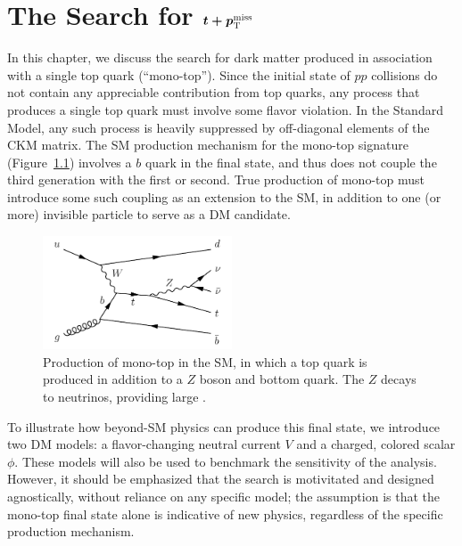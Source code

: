 \chapter{The Search for $\boldmath{t+p_\text{T}^\text{miss}}$}
\label{sec:mt}

In this chapter, we discuss the search for dark matter produced in association with a single top quark (``mono-top'').
Since the initial state of $pp$ collisions do not contain any appreciable contribution from top quarks, any process that produces a single top quark must involve some flavor violation.
In the Standard Model, any such process is heavily suppressed by off-diagonal elements of the CKM matrix.
The SM production mechanism for the mono-top signature (Figure~\ref{fig:mt:tzq}) involves a $b$ quark in the final state, and thus does not couple the third generation with the first or second.
True production of mono-top must introduce some such coupling as an extension to the SM, in addition to one (or more) invisible particle to serve as a DM candidate.

\begin{figure}[]
    \begin{center}
        \includegraphics[width=0.5\textwidth]{figures/monotop/diagrams/tzq.pdf}
        \caption{Production of mono-top in the SM, in which a top quark is produced in addition to a $Z$ boson and bottom quark. The $Z$ decays to neutrinos, providing large \ptmiss.}
        \label{fig:mt:tzq}
    \end{center}
\end{figure}

To illustrate how beyond-SM physics can produce this final state, we introduce two DM models: a flavor-changing neutral current $V$ and a charged, colored scalar $\phi$.
These models will also be used to benchmark the sensitivity of the analysis.
However, it should be emphasized that the search is motivitated and designed agnostically, without reliance on any specific model; the assumption is that the mono-top final state alone is indicative of new physics, regardless of the specific production mechanism.

